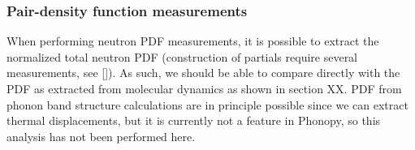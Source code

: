 \subsubsection{Pair-density function measurements}
When performing neutron PDF measurements, it is possible to extract the normalized total neutron PDF (construction of partials require several measurements, see []). As such, we should be able to compare directly with the PDF as extracted from molecular dynamics as shown in section XX. PDF from phonon band structure calculations are in principle possible since we can extract thermal displacements, but it is currently not a feature in Phonopy, so this analysis has not been performed here. 
